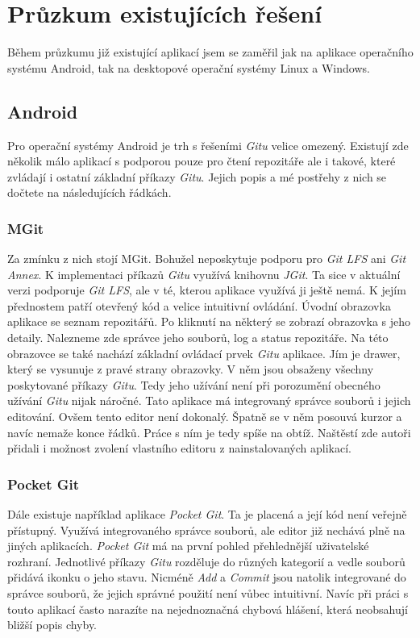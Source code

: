 \newpage
\section{Průzkum existujících řešení}
Během průzkumu již existující aplikací jsem se zaměřil jak na aplikace operačního systému Android, tak na desktopové operační systémy Linux a Windows.

    \subsection {Android}
    Pro operační systémy Android je trh s řešeními \emph{Gitu} velice omezený. Existují zde několik málo aplikací s podporou pouze pro čtení repozitáře ale i takové, které zvládají i ostatní základní příkazy \emph{Gitu}. Jejich popis a mé postřehy z nich se dočtete na následujících řádkách.

        \subsubsection{MGit~}
        Za zmínku z nich stojí MGit. Bohužel neposkytuje podporu pro \emph{Git LFS} ani \emph{Git Annex}. K implementaci příkazů \emph{Gitu} využívá knihovnu \emph{JGit}. Ta sice v aktuální verzi podporuje \emph{Git LFS}, ale v té, kterou aplikace využívá ji ještě nemá. K jejím přednostem patří otevřený kód a velice intuitivní ovládání.
        Úvodní obrazovka aplikace se seznam repozitářů. Po kliknutí na některý se zobrazí obrazovka s jeho detaily. Nalezneme zde správce jeho souborů, log a status repozitáře. Na této obrazovce se také nachází základní ovládací prvek \emph{Gitu} aplikace. Jím je drawer, který se vysunuje z pravé strany obrazovky. V něm jsou obsaženy všechny poskytované příkazy \emph{Gitu}. Tedy jeho užívání není při porozumění obecného užívání \emph{Gitu} nijak náročné. Tato aplikace má integrovaný správce souborů i jejich editování. Ovšem tento editor není dokonalý. Špatně se v něm posouvá kurzor a navíc nemaže konce řádků. Práce s ním je tedy spíše na obtíž. Naštěstí zde autoři přidali i možnost zvolení vlastního editoru z nainstalovaných aplikací.

        \subsubsection{Pocket Git~}
        Dále existuje například aplikace \emph{Pocket Git}. Ta je placená a její kód není veřejně přístupný. Využívá integrovaného správce souborů, ale editor již nechává plně na jiných aplikacích. \emph{Pocket Git} má na první pohled přehlednější uživatelské rozhraní. Jednotlivé příkazy \emph{Gitu} rozděluje do různých kategorií a vedle souborů přidává ikonku o jeho stavu. Nicméně \emph{Add} a \emph{Commit} jsou natolik integrované do správce souborů, že jejich správné použití není vůbec intuitivní. Navíc při práci s touto aplikací často narazíte na nejednoznačná chybová hlášení, která neobsahují bližší popis chyby.

